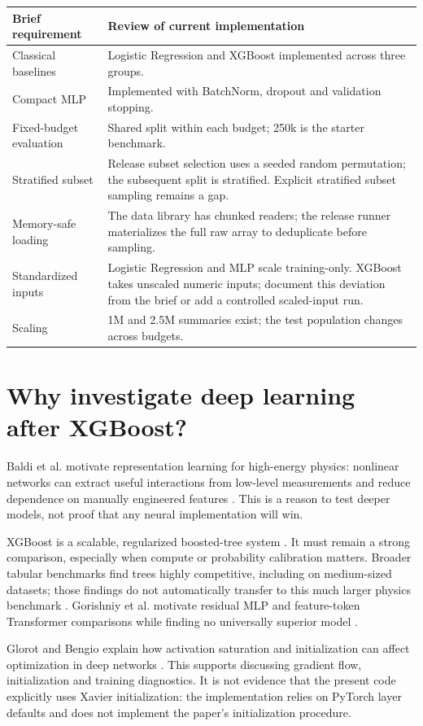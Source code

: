 \documentclass[11pt,a4paper]{article}
\begin{document}
\begin{tabularx}{\linewidth}{@{}lX@{}}\toprule
Brief requirement & Review of current implementation\\\midrule
Classical baselines & Logistic Regression and XGBoost implemented across three groups.\\
Compact MLP & Implemented with BatchNorm, dropout and validation stopping.\\
Fixed-budget evaluation & Shared split within each budget; 250k is the starter benchmark.\\
Stratified subset & Release subset selection uses a seeded random permutation; the subsequent split is stratified. Explicit stratified subset sampling remains a gap.\\
Memory-safe loading & The data library has chunked readers; the release runner materializes the full raw array to deduplicate before sampling.\\
Standardized inputs & Logistic Regression and MLP scale training-only. XGBoost takes unscaled numeric inputs; document this deviation from the brief or add a controlled scaled-input run.\\
Scaling & 1M and 2.5M summaries exist; the test population changes across budgets.\\\bottomrule
\end{tabularx}

\section{Why investigate deep learning after XGBoost?}
Baldi et al. motivate representation learning for high-energy physics: nonlinear networks can extract useful interactions from low-level measurements and reduce dependence on manually engineered features \cite{baldi}. This is a reason to test deeper models, not proof that any neural implementation will win.

XGBoost is a scalable, regularized boosted-tree system \cite{xgboost}. It must remain a strong comparison, especially when compute or probability calibration matters. Broader tabular benchmarks find trees highly competitive, including on medium-sized datasets; those findings do not automatically transfer to this much larger physics benchmark \cite{grinsztajn}. Gorishniy et al. motivate residual MLP and feature-token Transformer comparisons while finding no universally superior model \cite{gorishniy}.

Glorot and Bengio explain how activation saturation and initialization can affect optimization in deep networks \cite{glorot}. This supports discussing gradient flow, initialization and training diagnostics. It is not evidence that the present code explicitly uses Xavier initialization: the implementation relies on PyTorch layer defaults and does not implement the paper's initialization procedure.
\end{document}
